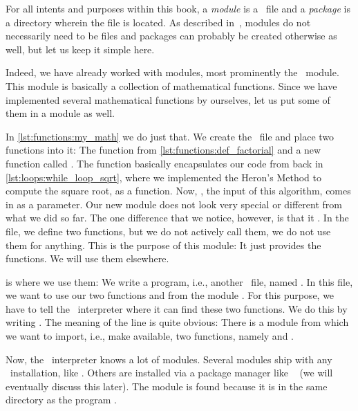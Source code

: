 For all intents and purposes within this book, a \emph{module} is a \python\ file and a \emph{package} is a directory wherein the file is located.
As described in~\cite{PSF2024TIS}, modules do not necessarily need to be files and packages can probably be created otherwise as well, but let us keep it simple here.

Indeed, we have already worked with modules, most prominently the~ module.
This module is basically a collection of mathematical functions.
Since we have implemented several mathematical functions by ourselves, let us put some of them in a module as well.

In \cref{lst:functions:my_math} we do just that.
We create the \python\ file  and place two functions into it:
The function  from \cref{lst:functions:def_factorial} and a new function called .
The  function basically encapsulates our code from back in \cref{lst:loops:while_loop_sqrt}, where we implemented the Heron's Method to compute the square root, as a function.
Now, , the input of this algorithm, comes in as a parameter.%
%
%
%
Our new module  does not look very special or different from what we did so far.
The one difference that we notice, however, is that it .
In the file, we define two functions, but we do not actively call them, we do not use them for anything.
This is the purpose of this module:
It just provides the functions.
We will use them elsewhere.

%
\begin{sloppypar}%
 is where we use them:
We write a program, i.e., another \python\ file, named .
In this file, we want to use our two functions  and  from the module .
For this purpose, we have to tell the \python\ interpreter where it can find these two functions.
We do this by writing .
The meaning of the line is quite obvious:
There is a module  from which we want to import, i.e., make available, two functions, namely  and .%
\end{sloppypar}%
%
Now, the \python\ interpreter knows a lot of modules.
Several modules ship with any \python\ installation, like .
Others are installed via a package manager like ~\cite{PSF2024IPM} (we will eventually discuss this later).
The  module is found because it is in the same directory as the program .

